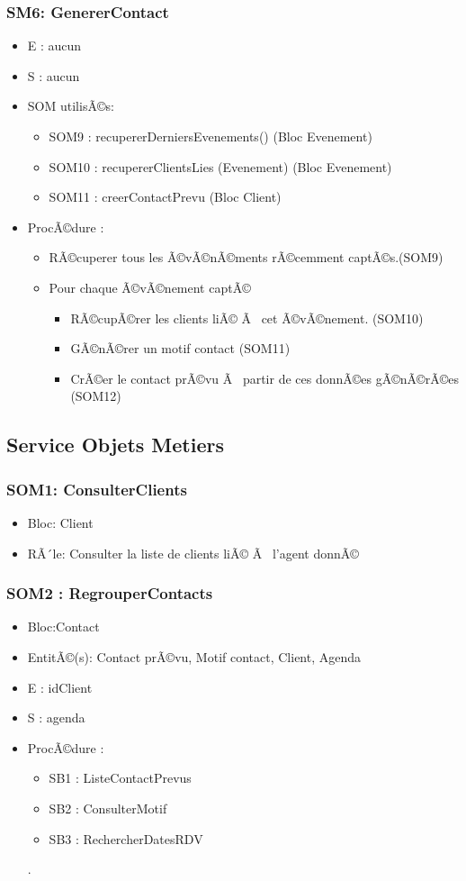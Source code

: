 \subsubsection{SM6: GenererContact}
\begin{itemize}
\item E : aucun
\item S : aucun
\item SOM utilisÃ©s: 	
\begin{itemize}		
\item SOM9 : recupererDerniersEvenements() (Bloc Evenement)
\item SOM10 : recupererClientsLies (Evenement) (Bloc Evenement)
\item SOM11 : creerContactPrevu (Bloc Client)	
\end{itemize}		
\item ProcÃ©dure : 	
\begin{itemize}		
\item RÃ©cuperer tous les Ã©vÃ©nÃ©ments rÃ©cemment captÃ©s.(SOM9)
\item Pour chaque Ã©vÃ©nement captÃ©
\begin{itemize}
\item RÃ©cupÃ©rer les clients liÃ© Ã  cet Ã©vÃ©nement. (SOM10)
\item GÃ©nÃ©rer un motif contact (SOM11)
\item CrÃ©er le contact prÃ©vu Ã  partir de ces donnÃ©es gÃ©nÃ©rÃ©es (SOM12)
\end{itemize}
\end{itemize}
\end{itemize}

\subsection{Service Objets Metiers}
\subsubsection{SOM1: ConsulterClients }
\begin{itemize}
\item Bloc: Client
\item RÃ´le: Consulter la liste de clients liÃ© Ã  l'agent donnÃ©
\end{itemize}
\subsubsection{SOM2 : RegrouperContacts}
\begin{itemize}
\item Bloc:Contact
\item EntitÃ©(s): Contact prÃ©vu, Motif contact, Client, Agenda
\item E : idClient
\item S : agenda	
\item ProcÃ©dure : 	
\begin{itemize}		
\item SB1 : ListeContactPrevus
\item SB2 : ConsulterMotif
\item SB3 : RechercherDatesRDV
\end{itemize}.
\end{itemize}
